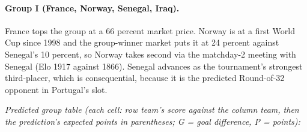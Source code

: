 \documentclass[11pt,letterpaper]{article}
\begin{document}


\paragraph{Group I (France, Norway, Senegal, Iraq).} France tops the group at a 66 percent market price. Norway is at a first World Cup since 1998 and the group-winner market puts it at 24 percent against Senegal's 10 percent, so Norway takes second via the matchday-2 meeting with Senegal (Elo 1917 against 1866). Senegal advances as the tournament's strongest third-placer, which is consequential, because it is the predicted Round-of-32 opponent in Portugal's slot.

\noindent\textit{\footnotesize Predicted group table (each cell: row team's score against the column team, then the prediction's expected points in parentheses; G = goal difference, P = points):}
\end{document}
